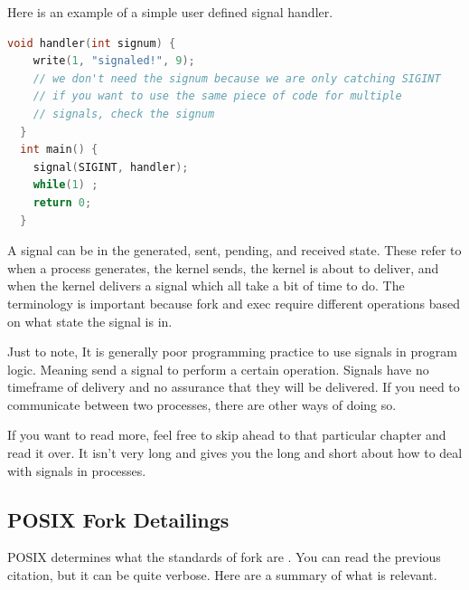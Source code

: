 \begin{itemize}
Here is an example of a simple user defined signal handler.

\begin{lstlisting}[language=C]
  void handler(int signum) {
    write(1, "signaled!", 9);
    // we don't need the signum because we are only catching SIGINT
    // if you want to use the same piece of code for multiple
    // signals, check the signum
  }
  int main() {
    signal(SIGINT, handler);
    while(1) ;
    return 0;
  }
\end{lstlisting}

A signal can be in the generated, sent, pending, and received state. These refer to when a process generates, the kernel sends, the kernel is about to deliver, and when the kernel delivers a signal which all take a bit of time to do.
The terminology is important because fork and exec require different operations based on what state the signal is in.

Just to note, It is generally poor programming practice to use signals in program logic.
Meaning send a signal to perform a certain operation.
Signals have no timeframe of delivery and no assurance that they will be delivered.
If you need to communicate between two processes, there are other ways of doing so.


If you want to read more, feel free to skip ahead to that particular chapter and read it over. It isn't very long and gives you the long and short about how to deal with signals in processes.

\subsection{POSIX Fork Detailings}

POSIX determines what the standards of fork are \cite{fork_2018}.
You can read the previous citation, but it can be quite verbose.
Here are a summary of what is relevant.


\end{itemize}
